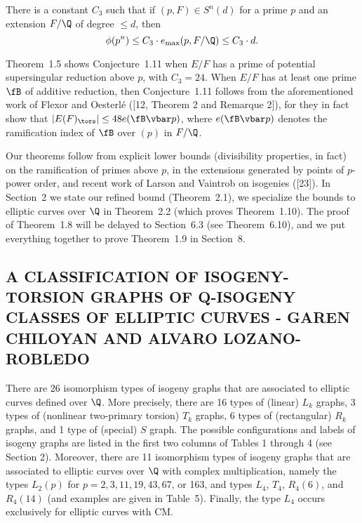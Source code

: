 \begin{conj} %
There is a constant $C_3$ such that if $(p, F) \in S^n(d)$ for a prime $p$ and an extension $F/\Q$ of degree $\leq d$, then
	\[
	\phi(p^n) \leq C_3 \cdot e_{\max}(p, F/\Q) \leq C_3 \cdot d. 
	\]
\end{conj}


Theorem~1.5 shows Conjecture~1.11 when $E/F$ has a prime of potential supersingular reduction above $p$, with $C_3= 24$. When $E/F$ has at least one prime $\fB$ of additive reduction, then Conjecture~1.11 follows from the aforementioned work of Flexor and Oesterl\'e ([12, Theorem 2 and Remarque 2]), for they in fact show that $|E(F)_\tors| \leq 48 e(\fB \vbar p)$, where $e(\fB \vbar p)$ denotes the ramification index of
$\fB$ over $(p)$ in $F/\Q$. 


Our theorems follow from explicit lower bounds (divisibility properties, in fact) on the ramification of primes above $p$, in the extensions generated by points of $p$-power order, and recent work of Larson and Vaintrob on isogenies ([23]). In Section~2 we state our refined bound (Theorem~2.1), we specialize the bounds to elliptic curves over $\Q$ in Theorem~2.2 (which proves Theorem~1.10). The proof of Theorem~1.8 will be delayed to Section~6.3 (see Theorem~6.10), and we put everything together to prove Theorem~1.9 in Section~8. 











\subsection{A CLASSIFICATION OF ISOGENY-TORSION GRAPHS OF Q-ISOGENY CLASSES OF ELLIPTIC CURVES - GAREN CHILOYAN AND ALVARO LOZANO-ROBLEDO}

\begin{thm} %
There are 26 isomorphism types of isogeny graphs that are associated to elliptic curves defined over $\Q$. More precisely, there are 16 types of (linear) $L_k$ graphs, 3 types of (nonlinear two-primary torsion) $T_k$ graphs, 6 types of (rectangular) $R_k$ graphs, and 1 type of (special) $S$ graph. The possible configurations and labels of isogeny graphs are listed in the first two columns of Tables 1 through 4 (see Section 2). Moreover, there are 11 isomorphism types of isogeny graphs that are associated to elliptic curves over $\Q$ with complex multiplication, namely the types $L_2(p)$ for $p= 2,3,11,19,43,67$, or 163, and types $L_4$, $T_4$, $R_4(6)$, and $R_4(14)$ (and examples are given in Table~5). Finally, the type $L_4$ occurs exclusively for elliptic curves with CM.
\end{thm}


